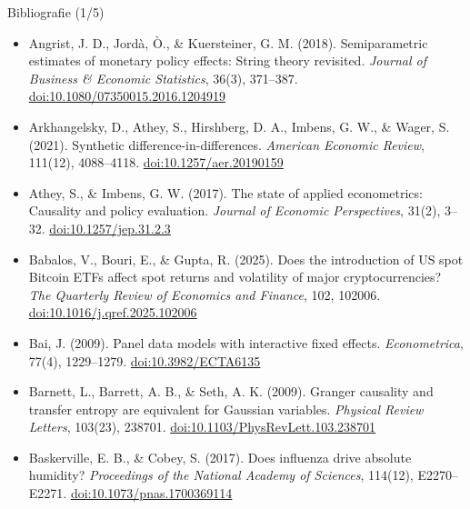 \begin{frame}{Bibliografie (1/5)}
\begin{itemize}
    \item Angrist, J. D., Jordà, Ò., \& Kuersteiner, G. M. (2018). Semiparametric estimates of monetary policy effects: String theory revisited. \textit{Journal of Business \& Economic Statistics}, 36(3), 371--387. \href{https://doi.org/10.1080/07350015.2016.1204919}{doi:10.1080/07350015.2016.1204919}
    \item Arkhangelsky, D., Athey, S., Hirshberg, D. A., Imbens, G. W., \& Wager, S. (2021). Synthetic difference-in-differences. \textit{American Economic Review}, 111(12), 4088--4118. \href{https://doi.org/10.1257/aer.20190159}{doi:10.1257/aer.20190159}
    \item Athey, S., \& Imbens, G. W. (2017). The state of applied econometrics: Causality and policy evaluation. \textit{Journal of Economic Perspectives}, 31(2), 3--32. \href{https://doi.org/10.1257/jep.31.2.3}{doi:10.1257/jep.31.2.3}
    \item Babalos, V., Bouri, E., \& Gupta, R. (2025). Does the introduction of US spot Bitcoin ETFs affect spot returns and volatility of major cryptocurrencies? \textit{The Quarterly Review of Economics and Finance}, 102, 102006. \href{https://doi.org/10.1016/j.qref.2025.102006}{doi:10.1016/j.qref.2025.102006}
    \item Bai, J. (2009). Panel data models with interactive fixed effects. \textit{Econometrica}, 77(4), 1229--1279. \href{https://doi.org/10.3982/ECTA6135}{doi:10.3982/ECTA6135}
    \item Barnett, L., Barrett, A. B., \& Seth, A. K. (2009). Granger causality and transfer entropy are equivalent for Gaussian variables. \textit{Physical Review Letters}, 103(23), 238701. \href{https://doi.org/10.1103/PhysRevLett.103.238701}{doi:10.1103/PhysRevLett.103.238701}
    \item Baskerville, E. B., \& Cobey, S. (2017). Does influenza drive absolute humidity? \textit{Proceedings of the National Academy of Sciences}, 114(12), E2270--E2271. \href{https://doi.org/10.1073/pnas.1700369114}{doi:10.1073/pnas.1700369114}
\end{itemize}
\end{frame}

